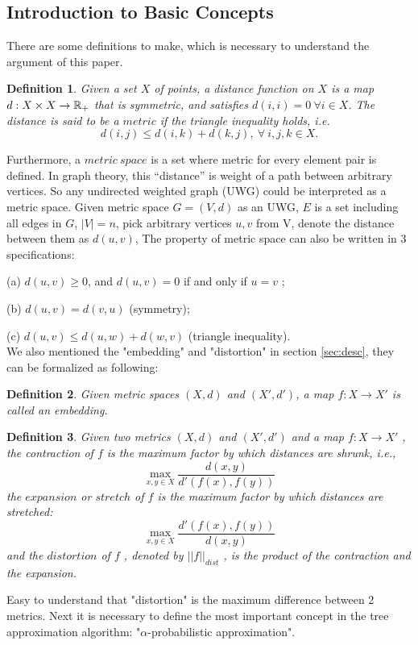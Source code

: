 \documentclass[11pt,twocolumn]{IEEEtran}
\newtheorem{Definition}{Definition}[section]
\begin{document}
\subsection{Introduction to Basic Concepts}
\label{sec:basic}
There are some definitions to make, which is necessary to understand the argument of this paper.
\begin{Definition}
Given a set $X$ of points, a \emph{distance function} on $X$ is a map $d : X \times X \to \mathbb{R}_+$ that is symmetric,
and satisfies $d(i, i) = 0\ \forall i \in X$. The distance is said to be a $metric$ if the triangle inequality
holds, i.e.
$$d(i, j) \leq d(i, k) + d(k, j),
\ \forall\ i, j, k \in X.$$
\end{Definition}
Furthermore, a $metric\ space$ is a set
where metric for every element pair is defined. In graph theory, this “distance” is weight of a
path between arbitrary vertices. So any undirected weighted graph (UWG) could be interpreted
as a metric space. Given metric space $G = (V, d)$ as an UWG, $E$ is a set including all edges in $G$, $|
V| = n$, pick arbitrary vertices $u, v$ from V, denote the distance between them as $d(u, v)$, The property of metric space can also be written in 3 specifications:\par
(a) $d(u, v) \geq 0$, and $d(u, v) = 0$ if and only if $u = v$ ;\par
(b) $d(u, v) = d(v, u)$ (symmetry);\par
(c) $d(u, v) \leq d(u, w) + d(w, v)$ (triangle inequality).
\\
We also mentioned the "embedding" and "distortion" in section \ref{sec:desc}, they can be formalized as
following:
\begin{Definition}
Given metric spaces $(X, d)$ and $(X', d' )$, a map $f : X \to X'$ is called an \emph{embedding}.
\end{Definition}
\begin{Definition}
Given two metrics $(X, d)$ and $(X' , d' )$ and a map $f : X \to X'$ , the \emph{contraction} of $f$ is the
maximum factor by which distances are shrunk, i.e.,
$$\max_{x,y\in X}\frac{d(x,y)}{d'(f(x),f(y))}$$
the $expansion$ or $stretch$ of $f$ is the maximum factor by which distances are stretched:
$$\max_{x,y\in X}\frac{d'(f(x),f(y))}{d(x,y)}$$
and the $distortion$ of $f$ , denoted by $||f||_{dist}$ , is the product of the contraction and the expansion.
\end{Definition}
Easy to understand that "distortion" is the maximum difference between 2 metrics. 
 Next it is necessary to 
define the most important concept in the tree approximation algorithm: "$\alpha$-probabilistic approximation".
\end{document}
